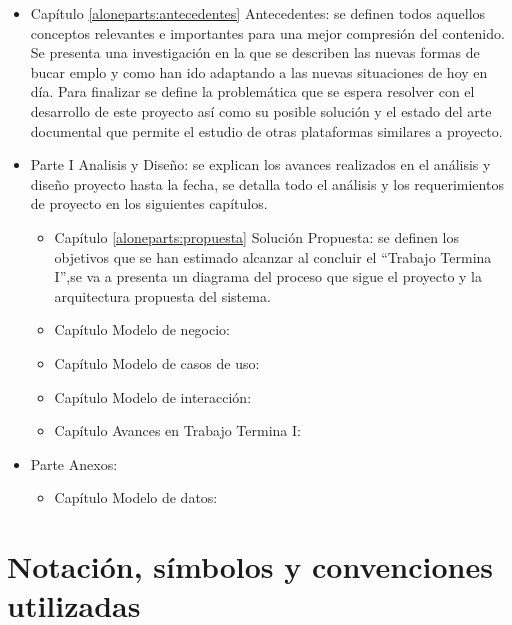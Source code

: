 	\begin{itemize}
		
		\item Capítulo \ref{aloneparts:antecedentes} Antecedentes:
		se definen todos aquellos conceptos  relevantes e importantes para una mejor compresión del contenido. Se presenta una 
		investigación en la que se describen las nuevas formas de bucar emplo y como han ido adaptando a las nuevas situaciones de hoy
		en día. Para finalizar se define la problemática que se espera resolver con el desarrollo de este proyecto así como su 
		posible solución y el estado del arte documental que permite el estudio de otras plataformas similares a proyecto.
		
		
		\item Parte I Analisis y Diseño: 
		se explican los avances realizados en el análisis y diseño proyecto hasta la fecha, se detalla todo el análisis y los 
		requerimientos de proyecto en los siguientes capítulos.

			\begin{itemize}
				\item Capítulo \ref{aloneparts:propuesta} Solución Propuesta: 
				se definen los objetivos que se han estimado alcanzar al concluir el ``Trabajo Termina I'',se va a presenta un diagrama
				del proceso que sigue el proyecto y la arquitectura propuesta del sistema.

				\item Capítulo  Modelo de negocio: 

				\item Capítulo Modelo de casos de uso: 

				\item Capítulo  Modelo de interacción: 

				\item Capítulo Avances en Trabajo Termina I: 
			\end{itemize}

		

		\item Parte  Anexos: 
			\begin{itemize}
				\item Capítulo Modelo de datos: 
			\end{itemize}
	\end{itemize}


\section{Notación, símbolos y convenciones utilizadas}

